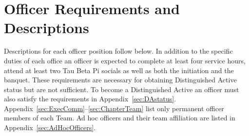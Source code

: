 \chapter{Officer Requirements and Descriptions}\label{sec:officerreq}
Descriptions for each officer position follow below. In addition to the specific duties of each office an officer is expected to complete at least four service hours, attend at least two Tau Beta Pi socials as well as both the initiation and the banquet.  These requirements are necessary for obtaining Distinguished Active status but are not sufficient.  To become a Distinguished Active an officer must also satisfy the requirements in Appendix~\ref{sec:DAstatus}. Appendix~\ref{sec:ExecComm}--\ref{sec:ChapterTeam} list only permanent officer members of each Team. Ad hoc officers and their team affiliation are listed in Appendix~\ref{sec:AdHocOfficers}.

